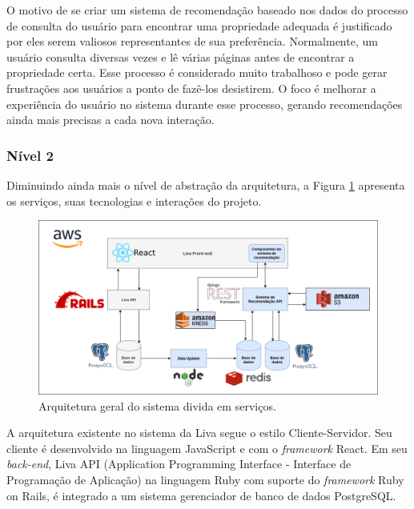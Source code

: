 O motivo de se criar um sistema de recomendação baseado nos dados do processo de consulta do usuário para encontrar uma propriedade adequada é justificado por eles serem valiosos representantes de sua preferência. Normalmente, um usuário consulta diversas vezes e lê várias páginas antes de encontrar a propriedade certa. Esse processo é considerado muito trabalhoso e pode gerar frustrações aos usuários a ponto de fazê-los desistirem. O foco é melhorar a experiência do usuário no sistema durante esse processo, gerando recomendações ainda mais precisas a cada nova interação.

\subsubsection{Nível 2}

Diminuindo ainda mais o nível de abstração da arquitetura, a Figura \ref{fig:sr_nivel2} apresenta os serviços, suas tecnologias e interações do projeto.

\begin{figure}[H]
    \centering
    \includegraphics[scale=0.4]{figuras/proposta/sr_nivel2.png}
    \caption[Arquitetura geral do sistema divida em serviços]{Arquitetura geral do sistema divida em serviços.}
    \label{fig:sr_nivel2}
\end{figure}

A arquitetura existente no sistema da Liva segue o estilo Cliente-Servidor. Seu cliente é desenvolvido na linguagem JavaScript e com o \textit{framework} React. Em seu \textit{back-end}, Liva API (Application Programming Interface - Interface de Programação de Aplicação) na linguagem Ruby com suporte do \textit{framework} Ruby on Rails, é integrado a um sistema gerenciador de banco de dados PostgreSQL.


